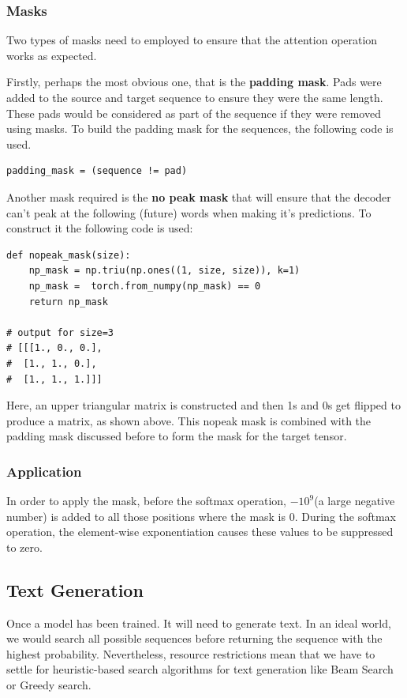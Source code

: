 \documentclass[12pt,a4paper,twoside,openright]{report}
\begin{document}
\subsubsection{Masks}
Two types of masks need to employed to ensure that the attention operation works as expected.

Firstly, perhaps the most obvious one, that is the \textbf{padding mask}. Pads were added to the source and target sequence to ensure they were the same length. These pads would be considered as part of the sequence if they were removed using masks. To build the padding mask for the sequences, the following code is used.
\begin{lstlisting}[label=padding-code]
    padding_mask = (sequence != pad)
\end{lstlisting}

Another mask required is the \textbf{no peak mask} that will ensure that the decoder can't peak at the following (future) words when making it's predictions. To construct it the following code is used:
\begin{lstlisting}[label=nopeak-mask-code,caption=No Peak Mask generator]
def nopeak_mask(size):
    np_mask = np.triu(np.ones((1, size, size)), k=1)
    np_mask =  torch.from_numpy(np_mask) == 0
    return np_mask

# output for size=3
# [[[1., 0., 0.],
#  [1., 1., 0.],
#  [1., 1., 1.]]]
\end{lstlisting}

Here, an upper triangular matrix is constructed and then 1s and 0s get flipped to produce a matrix, as shown above. This nopeak mask is combined with the padding mask discussed before to form the mask for the target tensor.

\subsubsection{Application}
In order to apply the mask, before the softmax operation, $-10^9$(a large negative number) is added to all those positions where the mask is 0. During the softmax operation, the element-wise exponentiation causes these values to be suppressed to zero.

\subsection{Text Generation}
\label{text-generation}
Once a model has been trained. It will need to generate text.
In an ideal world, we would search all possible sequences before returning the sequence with the highest probability. Nevertheless, resource restrictions mean that we have to settle for heuristic-based search algorithms for text generation like Beam Search or Greedy search.
\end{document}
